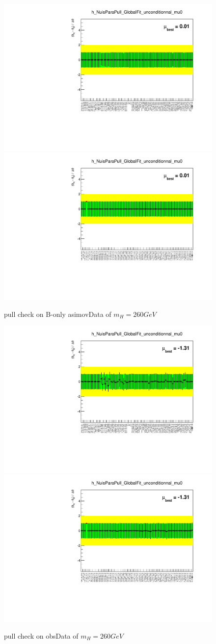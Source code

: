 \begin{figure}
\includegraphics[width=.4\textwidth, angle=-90]{fig/Statistical/combination/pull-exp-combined-mH260_1.pdf}
\includegraphics[width=.4\textwidth, angle=-90]{fig/Statistical/combination/pull-exp-combined-mH260_2.pdf}
\caption{pull check on B-only asimovData of $m_{H}=260 GeV$}
\label{fig:pull-exp-comb-260}
\end{figure}


\begin{figure}
\includegraphics[width=.45\textwidth, angle=-90]{fig/Statistical/combination/pull-obs-combined-mH260_1.pdf}
\includegraphics[width=.45\textwidth, angle=-90]{fig/Statistical/combination/pull-obs-combined-mH260_2.pdf}
\caption{pull check on obsData of $m_{H}=260 GeV$}
\label{fig:pull-obs-comb-260}
\end{figure}

